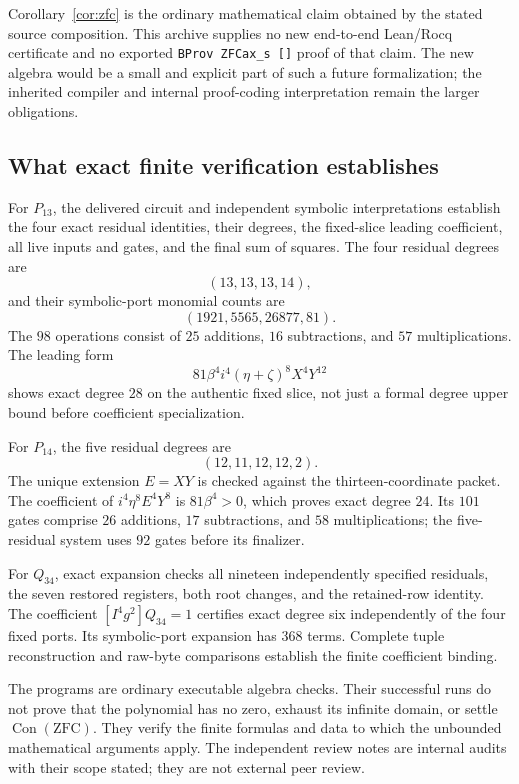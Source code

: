 \documentclass[11pt,a4paper]{article}
\theoremstyle{definition}
\newcommand{\ZFC}{\mathrm{ZFC}}
\newcommand{\Con}{\operatorname{Con}}
\begin{document}
Corollary~\ref{cor:zfc} is the ordinary mathematical claim obtained by
the stated source composition.  This archive supplies no new
end-to-end Lean/Rocq certificate and no exported
\texttt{BProv ZFCax\_s []} proof of that claim.  The new algebra would be
a small and explicit part of such a future formalization; the inherited
compiler and internal proof-coding interpretation remain the larger
obligations.

\subsection{What exact finite verification establishes}

For \(P_{13}\), the delivered circuit and independent symbolic
interpretations establish the four exact residual identities, their
degrees, the fixed-slice leading coefficient, all live inputs and
gates, and the final sum of squares.  The four residual degrees are
\[
 (13,13,13,14),
\]
and their symbolic-port monomial counts are
\[
 (1921,5565,26877,81).
\]
The \(98\) operations consist of \(25\) additions, \(16\) subtractions,
and \(57\) multiplications.  The leading form
\[
 81\beta^4 i^4(\eta+\zeta)^8X^4Y^{12}
\]
shows exact degree \(28\) on the authentic fixed slice, not just a
formal degree upper bound before coefficient specialization.

For \(P_{14}\), the five residual degrees are
\[
 (12,11,12,12,2).
\]
The unique extension \(E=XY\) is checked against the thirteen-coordinate
packet.  The coefficient of \(i^4\eta^8E^4Y^8\) is \(81\beta^4>0\),
which proves exact degree \(24\).  Its \(101\) gates comprise \(26\)
additions, \(17\) subtractions, and \(58\) multiplications; the
five-residual system uses \(92\) gates before its finalizer.

For \(Q_{34}\), exact expansion checks all nineteen independently
specified residuals, the seven restored registers, both root changes,
and the retained-row identity.  The coefficient
\([I^4g^2]Q_{34}=1\) certifies exact degree six independently of the
four fixed ports.  Its symbolic-port expansion has \(368\) terms.
Complete tuple reconstruction and raw-byte comparisons establish the
finite coefficient binding.

The programs are ordinary executable algebra checks.  Their successful
runs do not prove that the polynomial has no zero, exhaust its infinite
domain, or settle \(\Con(\ZFC)\).  They verify the finite formulas and
data to which the unbounded mathematical arguments apply.  The
independent review notes are internal audits with their scope stated;
they are not external peer review.
\end{document}
